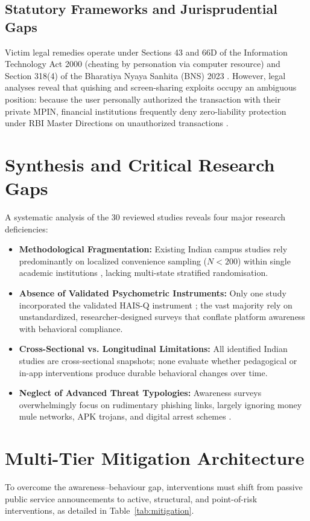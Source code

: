 \documentclass[journal,10pt,twocolumn]{IEEEtran}
\begin{document}
\subsection{Statutory Frameworks and Jurisprudential Gaps}
Victim legal remedies operate under Sections 43 and 66D of the Information Technology Act 2000 (cheating by personation via computer resource) and Section 318(4) of the Bharatiya Nyaya Sanhita (BNS) 2023 \cite{anivicus2026, systems2024}. However, legal analyses reveal that quishing and screen-sharing exploits occupy an ambiguous position: because the user personally authorized the transaction with their private MPIN, financial institutions frequently deny zero-liability protection under RBI Master Directions on unauthorized transactions \cite{anivicus2026, sharma2024}.

\section{Synthesis and Critical Research Gaps}
A systematic analysis of the 30 reviewed studies reveals four major research deficiencies:
\begin{itemize}
    \item \textbf{Methodological Fragmentation:} Existing Indian campus studies rely predominantly on localized convenience sampling ($N < 200$) within single academic institutions \cite{karkera2024, roy2026}, lacking multi-state stratified randomisation.
    \item \textbf{Absence of Validated Psychometric Instruments:} Only one study incorporated the validated HAIS-Q instrument \cite{arxiv2024}; the vast majority rely on unstandardized, researcher-designed surveys that conflate platform awareness with behavioral compliance.
    \item \textbf{Cross-Sectional vs. Longitudinal Limitations:} All identified Indian studies are cross-sectional snapshots; none evaluate whether pedagogical or in-app interventions produce durable behavioral changes over time.
    \item \textbf{Neglect of Advanced Threat Typologies:} Awareness surveys overwhelmingly focus on rudimentary phishing links, largely ignoring money mule networks, APK trojans, and digital arrest schemes \cite{mukhopadhyay2024}.
\end{itemize}

\section{Multi-Tier Mitigation Architecture}
To overcome the awareness--behaviour gap, interventions must shift from passive public service announcements to active, structural, and point-of-risk interventions, as detailed in Table~\ref{tab:mitigation}.
\end{document}
